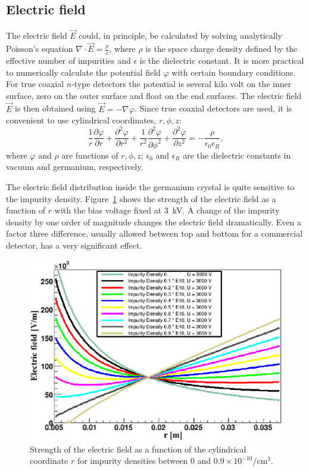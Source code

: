 \documentclass[epj]{svjour}
\begin{document}
\subsection{Electric field}
\label{s:field}
The electric field $\vec{E}$ could, in principle, be calculated by
solving analytically Poisson's equation $\nabla \cdot \vec{E} =
\frac{\rho}{\epsilon}$, where $\rho$ is the space charge density
defined by the effective number of impurities and $\epsilon$ is the
dielectric constant. It is more practical to numerically calculate the
potential field $\varphi$ with certain boundary conditions. For true
coaxial $n$-type detectors the potential is several kilo volt on the
inner surface, zero on the outer surface and float on the end
surfaces. The electric field $\vec{E}$ is then obtained using $\vec{E}
= - \nabla \varphi$. Since true coaxial detectors are used, it is
convenient to use cylindrical coordinates, $r, \phi, z$:
\begin{equation} 
\frac{1}{r} \frac{\partial \varphi}{\partial r} + 
\frac{\partial^{2} \varphi}{\partial r^{2}} + 
\frac{1}{r^{2}} \frac{\partial^{2} \varphi}{\partial \phi^{2}} + 
\frac{\partial^{2} \varphi}{\partial z^{2}} = 
- \frac{\rho}{\epsilon_{0} \epsilon_{R}}, 
\label{e:pocyl} 
\end{equation} 
where $\varphi$ and $\rho$ are functions of $r, \phi, z$;
$\epsilon_{0}$ and $\epsilon_{R}$ are the dielectric constants in
vacuum and germanium, respectively.
 
The electric field distribution inside the germanium crystal is quite
sensitive to the impurity density. Figure~\ref{f:rho} shows the
strength of the electric field as a function of $r$ with the bias
voltage fixed at 3~kV. A change of the impurity density by one order
of magnitude changes the electric field dramatically. Even a factor
three difference, usually allowed between top and bottom for a
commercial detector, has a very significant effect.
 
\begin{figure}[htbp]
\centering
\includegraphics[width=\linewidth]{rho} 
\caption{Strength of the electric field as a function of the
cylindrical coordinate $r$ for impurity densities between 0 and $0.9
\times 10^{-10}$/cm$^{3}$.}
\label{f:rho} 
\end{figure} 
\end{document}
